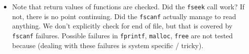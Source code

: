 \begin{itemize}
 \item Note that return values of functions are checked. 
 Did the \texttt{fseek} call work? If not, there is no point continuing.
 Did the \texttt{fscanf} actually manage to read anything.
 We don't explicitly check for end of file, but that is covered by \texttt{fscanf} failures.
 Possible failures in \texttt{fprintf}, \texttt{malloc}, \texttt{free} are not tested because 
 (dealing with these failures is system specific / tricky).
\end{itemize}



